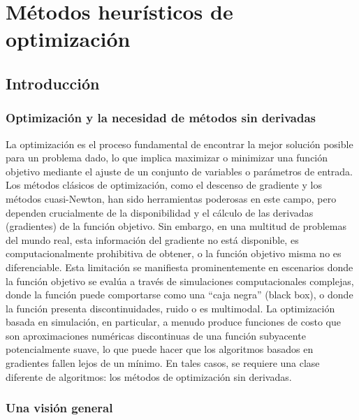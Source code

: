 \chapter{Métodos heurísticos de optimización}

\section{Introducción}

\subsection{Optimización y la necesidad de métodos sin derivadas}

La optimización es el proceso fundamental de encontrar la mejor solución posible para un problema dado, lo que implica maximizar o minimizar una función objetivo mediante el ajuste de un conjunto de variables o parámetros de entrada. Los métodos clásicos de optimización, como el descenso de gradiente y los métodos cuasi-Newton, han sido herramientas poderosas en este campo, pero dependen crucialmente de la disponibilidad y el cálculo de las derivadas (gradientes) de la función objetivo. Sin embargo, en una multitud de problemas del mundo real, esta información del gradiente no está disponible, es computacionalmente prohibitiva de obtener, o la función objetivo misma no es diferenciable. Esta limitación se manifiesta prominentemente en escenarios donde la función objetivo se evalúa a través de simulaciones computacionales complejas, donde la función puede comportarse como una “caja negra” (black box), o donde la función presenta discontinuidades, ruido o es multimodal. La optimización basada en simulación, en particular, a menudo produce funciones de costo que son aproximaciones numéricas discontinuas de una función subyacente potencialmente suave, lo que puede hacer que los algoritmos basados en gradientes fallen lejos de un mínimo. En tales casos, se requiere una clase diferente de algoritmos: los métodos de optimización sin derivadas.

\subsection{Una visión general}

